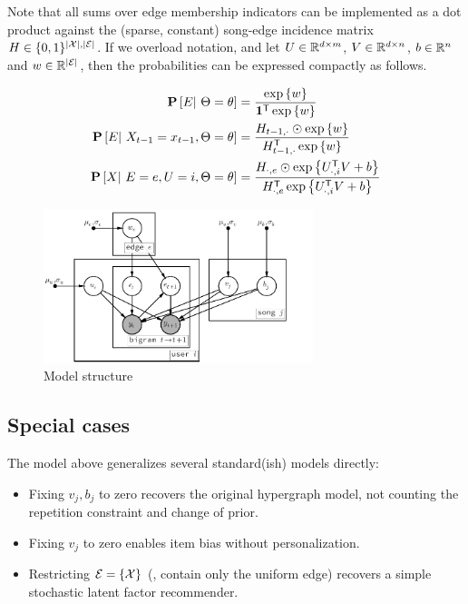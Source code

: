 \documentclass{article}
\def\E{\ensuremath{\mathcal{E}}}
\begin{document}
Note that all sums over edge membership indicators can be implemented as a dot product against the (sparse, constant) 
song-edge incidence matrix $H \in \{0,1\}^{|\X|, |\E|}$.  If we overload notation, and let $U \in \mathbb{R}^{d\times m}$, $V \in \mathbb{R}^{d \times n}$, $b \in \mathbb{R}^{n}$ and $w \in
\R^{|\E|}$, then the probabilities can be expressed compactly as follows.

\begin{align*}
\mathbf{P}\left[E |~ \Theta=\theta\right] &= \frac{\exp\left\{w\right\}}{\mathbf{1}^\mathsf{T} \exp\left\{w\right\}}\\
\mathbf{P}\left[E |~ X_{t-1}=x_{t-1}, \Theta=\theta\right] &= \frac{ H_{t-1, \cdot} \odot \exp\left\{w\right\} }{H_{t-1, \cdot}^\mathsf{T} \exp\left\{w\right\}}\\
\mathbf{P}\left[X |~ E=e, U=i, \Theta=\theta\right] &= \frac{ H_{\cdot, e} \odot \exp\left\{U_{\cdot,i}^\mathsf{T} V + b\right\} }{ H_{\cdot, e}^\mathsf{T} \exp\left\{U_{\cdot,i}^\mathsf{T} V + b\right\}}
\end{align*}

\begin{figure}
\centering
\includegraphics[width=0.7\textwidth]{model}
\caption{Model structure}
\end{figure}

\subsection{Special cases}
The model above generalizes several standard(ish) models directly:
\begin{itemize}
\item Fixing $v_j, b_j$ to zero recovers the original hypergraph model, not counting the repetition constraint and
change of prior.
\item Fixing $v_j$ to zero enables item bias without personalization.
\item Restricting $\E = \{ \X \}$ (\ie, contain only the uniform edge) recovers a simple stochastic latent factor recommender.
\end{itemize}
\end{document}
